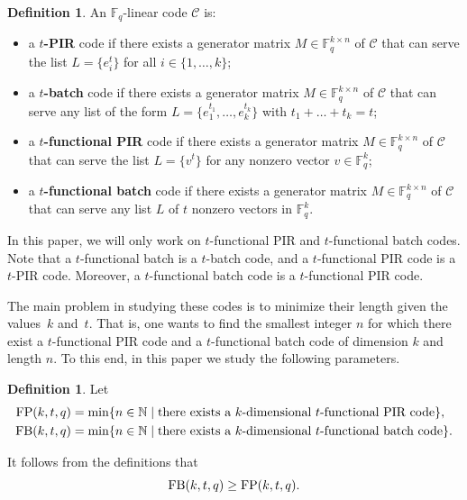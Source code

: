 \documentclass[11pt,a4paper]{article}
\theoremstyle{definition}
\newtheorem{definition}[theorem]{Definition}
\newcommand{\N}{\mathbb N}
\newcommand{\F}{\mathbb F}
\newcommand{\Cc}{\mathcal C}
\newcommand{\fb}{\textnormal{FB}}
\newcommand{\fp}{\textnormal{FP}}
\begin{document}
\begin{definition}
An $\F_q$-linear code $\Cc$ is: 
\begin{itemize}
    \item a \textbf{$t$-PIR} code if there exists a generator matrix $M\in\F_q^{k\times n}$ of $\Cc$ that can serve the list $L=\{e_i^t\}$ for all $i \in \{1,\ldots,k\}$;
    \item a \textbf{$t$-batch} code if there exists a generator matrix $M\in\F_q^{k\times n}$ of $\Cc$ that can serve any list of the form
    $L = \{e_1^{t_1},\ldots,e_k^{t_k}\}$ with $t_1+\dots+t_k=t$;
    \item a \textbf{$t$-functional PIR} code if there exists a generator matrix $M\in\F_q^{k\times n}$ of $\Cc$ that can serve the list $L=\{v^t\}$ for any nonzero vector $v \in \F_q^k$;
    \item a \textbf{$t$-functional batch} code if there exists a generator matrix $M\in\F_q^{k\times n}$ of $\Cc$ that can serve any list $L$ of $t$ nonzero vectors in $\F_q^k$.
\end{itemize}
\end{definition}
In this paper, we will only work on $t$-functional PIR and $t$-functional batch codes. Note that a $t$-functional batch is a $t$-batch code, and a $t$-functional PIR code is a $t$-PIR code. Moreover, a $t$-functional batch code is a $t$-functional PIR code. 

The main problem in studying these codes is to minimize their length given the values~$k$ and~$t$. That is, one wants to find the smallest integer $n$ for which there exist a $t$-functional PIR code and a $t$-functional batch code of dimension $k$ and length $n$. To this end, in this paper we study the following parameters.

\begin{definition}
    Let
\begin{align*}
    \fp(k,t,q)&=\min\{n \in \N \mid \mbox{there exists a }k\mbox{-dimensional }t\mbox{-functional PIR code}\},\\
    \fb(k,t,q)&=\min\{n \in \N \mid \mbox{there exists a }k\mbox{-dimensional }t\mbox{-functional batch code}\}.
\end{align*}
\end{definition}
\noindent It follows from the definitions that
\begin{equation*}
    \fb(k,t,q)\geq\fp(k,t,q).
\end{equation*}
\end{document}
